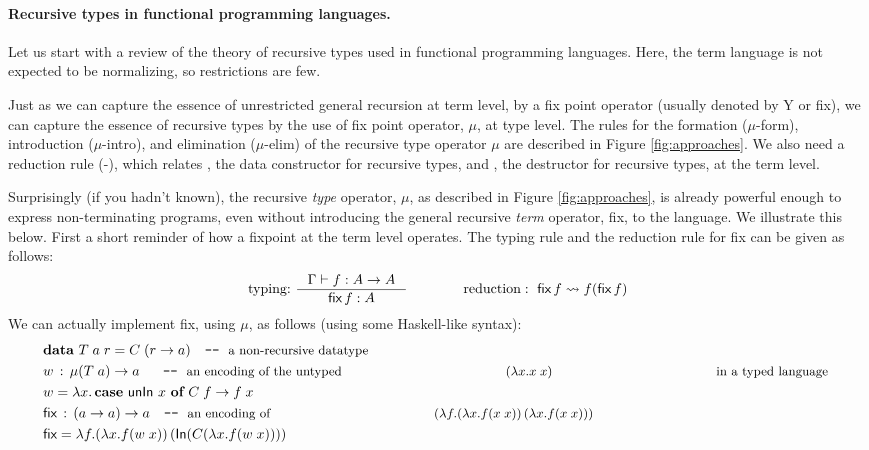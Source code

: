 \paragraph{Recursive types in functional programming languages.}
Let us start with a review of the theory of recursive types used
in functional programming languages. Here, the term
language is not expected to be normalizing, so restrictions are few.

Just as we can capture the essence of unrestricted general recursion at term
level, by a fix point operator (usually denoted by \textsf{Y} or \textsf{fix}),
we can capture the essence of recursive types by the
use of fix point operator, $\mu$, at type level. 
The rules for the formation {\small($\mu$-form)},
introduction {\small($\mu$-intro)}, and elimination {\small($\mu$-elim)} of
the recursive type operator $\mu$ are described in Figure \ref{fig:approaches}.
We also need a reduction rule {\small(\unIn-\In)}, which relates \In,
the data constructor for recursive types, and \unIn, the destructor for
recursive types, at the term level.

Surprisingly (if you hadn't known), the recursive {\em type} operator, $\mu$,
as described in Figure \ref{fig:approaches}, is already powerful enough to
express non-terminating programs, even without introducing the general recursive
{\em term} operator, \textsf{fix}, to the language. We illustrate this below.
First a short reminder of how a fixpoint at the term level operates.
The typing rule and the reduction rule for \textsf{fix} can be given as follows:
\[ \text{typing:}~ \inference{\Gamma |- f : A -> A}{\textsf{fix}\,f : A}
 \qquad\qquad
   \text{reduction}:~ \textsf{fix}\,f \rightsquigarrow f(\textsf{fix}\,f)
\]
We can actually implement \textsf{fix}, using $\mu$, as follows
(using some Haskell-like syntax):
\begin{align*}
& \textbf{data}~T\;a\;r = C\;(r -> a) \quad
          \texttt{-}\texttt{-}~\text{\small a non-recursive datatype} \\
& w \,:\, \mu(T\;a) -> a ~~ \quad
          \texttt{-}\texttt{-}~\text{\small an encoding of the untyped
                                     $(\lambda x.x\;x)$
                                     in a typed language}~ \\
& w = \lambda x . \,\textbf{case}~\mathsf{unIn}~x~\textbf{of}~C\;f -> f\;x \\
& \textsf{fix} \,:\, (a -> a) -> a \quad
          \texttt{-}\texttt{-}~\text{\small an encoding of 
                                     $(\lambda f.(\lambda x.f(x\;x))\,
                                                 (\lambda x.f(x\;x)))$} \\
& \textsf{fix} = \lambda f. (\lambda x. f (w\;x))\,(\mathsf{In}(C(\lambda x. f (w\;x))))
\end{align*}

